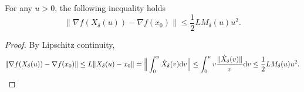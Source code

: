 \documentclass[twoside,11pt]{article}
\newcommand{\der}[1]{\dot #1}
\newcommand{\norm}[1]{\|#1\|}
\renewcommand{\d}{{\mathrm{d}}}
\def\half{\frac{1}{2}}
\begin{document}
\begin{lemma}\label{lm:lipsch-gra}
For any $u > 0$, the following inequality holds
\begin{equation}\nonumber
\norm{\nabla f(X_{\delta}(u)) - \nabla f(x_0)} \le \half LM_{\delta}(u)u^2.
\end{equation}
\end{lemma}
\begin{proof}
By Lipschitz continuity,
\begin{equation*}
\norm{\nabla f(X_{\delta}(u)) - \nabla f(x_0)} \le L\norm{X_{\delta}(u) - x_0} = \Big{\|}\int_0^u\der{X_{\delta}}(v)\d v\Big{\|}\le \int_0^uv\frac{\norm{\der{X_{\delta}}(v)}}{v}\d v \le \half LM_{\delta}(u)u^2.
\end{equation*}
\end{proof}
\end{document}
